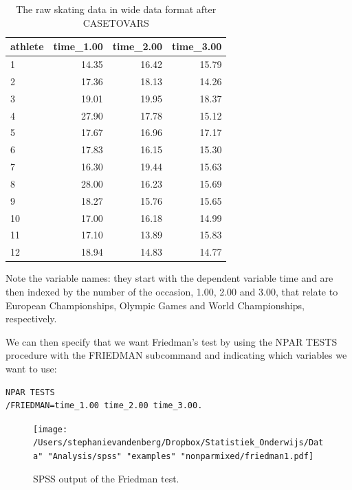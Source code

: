 \documentclass[]{report}\usepackage[]{graphicx}\usepackage[]{color}
\begin{document}
\begin{table}[ht]
\centering
\caption{The raw skating data in wide data format after CASETOVARS} 
\label{tab:nonparmixed_7}
\begin{tabular}{lrrr}
  \hline
athlete & time\_1.00 & time\_2.00 & time\_3.00 \\ 
  \hline
1 & 14.35 & 16.42 & 15.79 \\ 
  2 & 17.36 & 18.13 & 14.26 \\ 
  3 & 19.01 & 19.95 & 18.37 \\ 
  4 & 27.90 & 17.78 & 15.12 \\ 
  5 & 17.67 & 16.96 & 17.17 \\ 
  6 & 17.83 & 16.15 & 15.30 \\ 
  7 & 16.30 & 19.44 & 15.63 \\ 
  8 & 28.00 & 16.23 & 15.69 \\ 
  9 & 18.27 & 15.76 & 15.65 \\ 
  10 & 17.00 & 16.18 & 14.99 \\ 
  11 & 17.10 & 13.89 & 15.83 \\ 
  12 & 18.94 & 14.83 & 14.77 \\ 
   \hline
\end{tabular}
\end{table}


Note the variable names: they start with the dependent variable time and are then indexed by the number of the occasion, 1.00, 2.00 and 3.00, that relate to European Championships, Olympic Games and World Championships, respectively.

We can then specify that we want Friedman's test by using the NPAR TESTS procedure with the FRIEDMAN subcommand and indicating which variables we want to use:

\begin{verbatim}
NPAR TESTS
/FRIEDMAN=time_1.00 time_2.00 time_3.00.
\end{verbatim}

\begin{figure}[h]
    \begin{center}
       \texttt{[image: /Users/stephanievandenberg/Dropbox/Statistiek\_Onderwijs/Data" "Analysis/spss" "examples" "nonparmixed/friedman1.pdf]}
    \end{center}
     \caption{SPSS output of the Friedman test.}
    \label{fig:friedman1}
\end{figure}
\end{document}
